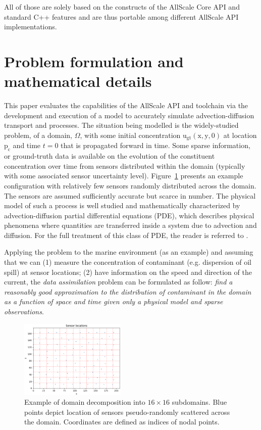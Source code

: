 \documentclass[conference,compsoc]{IEEEtran}
\begin{document}
All of those are solely based on the constructs of the AllScale Core API and
standard C++ features and are thus portable among different AllScale API
implementations.

\section{Problem formulation and mathematical details}
\label{sec:AMDADOS}

This paper evaluates the capabilities of the AllScale API and toolchain via the development and execution of a model to accurately simulate advection-diffusion transport and processes. The situation being modelled is the widely-studied problem, of a domain, $\Omega$, with some initial concentration $\mathrm{u_{gt}(x,y,0)}$ at location $\mathrm{p_c}$ and time $t=0$ that is propagated forward in time. Some sparse information, or ground-truth data is available on the evolution of the constituent concentration over time from sensors distributed within the domain (typically with some associated sensor uncertainty level). Figure~\ref{fig:sensors} presents an example configuration with relatively few sensors randomly distributed across the domain. The sensors are assumed sufficiently accurate but scarce in number. The physical model of such a process is well studied and mathematically characterized by advection-diffusion partial differential equations (PDE), which describes physical phenomena where quantities are transferred inside a system due to advection and diffusion. For the full treatment of this class of PDE, the reader is referred to \cite{Hundsdorfer03}.

Applying the problem to the marine environment (as an example) and assuming that we can (1) measure the concentration of contaminant (e.g. dispersion of oil spill) at sensor locations; (2) have information on the speed and direction of the current, the \textit{data assimilation} problem can be formulated as follow: \textit{find a reasonably good approximation to the distribution of contaminant in the domain as a function of space and time given only a physical model and sparse observations}.

\begin{figure}
\includegraphics[width=0.45\textwidth]{images/sensors-Nx208-Ny176}
\caption{Example of domain decomposition into ${16{\times}16}$ subdomains. Blue points depict location of sensors pseudo-randomly scattered across the domain. Coordinates are defined as indices of nodal points.}
\label{fig:sensors}
\end{figure}
\end{document}
